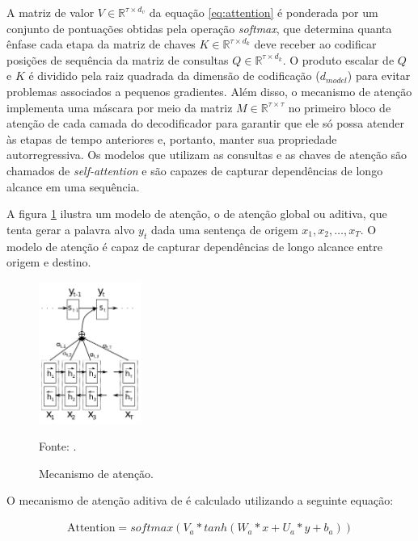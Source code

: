             \ipar A matriz de valor $V \in \mathbb{R}^{\tau \times d_v}$ da equação \ref{eq:attention} é ponderada por um conjunto de pontuações obtidas pela operação \textit{softmax}, que determina quanta ênfase cada etapa da matriz de chaves $K \in \mathbb{R}^{\tau \times d_k}$ deve receber ao codificar posições de sequência da matriz de consultas $Q \in \mathbb{R}^{\tau \times d_k}$. O produto escalar de $Q$ e $K$ é dividido pela raiz quadrada da dimensão de codificação ($d_{model}$) para evitar problemas associados a pequenos gradientes. Além disso, o mecanismo de atenção implementa uma máscara por meio da matriz $M \in \mathbb{R}^{\tau \times \tau}$ no primeiro bloco de atenção de cada camada do decodificador para garantir que ele só possa atender às etapas de tempo anteriores e, portanto, manter sua propriedade autorregressiva. Os modelos que utilizam as consultas e as chaves de atenção são chamados de \textit{self-attention} e são capazes de capturar dependências de longo alcance em uma sequência. 

            \ipar A figura \ref{fig:attention} ilustra um modelo de atenção, o de atenção global ou aditiva, que tenta gerar a palavra alvo $y_t$ dada uma sentença de origem $x_1, x_2, \dots, x_T$. O modelo de atenção é capaz de capturar dependências de longo alcance entre origem e destino.

            \begin{figure}[H]
                \centering
                \caption{Mecanismo de atenção.}
                \label{fig:attention}
                \includegraphics[width=0.3\textwidth]{imagens/attention.png}
                \par \footnotesize Fonte: .
            \end{figure}

            \ipar O mecanismo de atenção aditiva de  é calculado utilizando a seguinte equação:

            \begin{equation} 
                \begin{aligned} 
                    \text{Attention} = softmax(V_a * tanh(W_a * x + U_a * y + b_a)) 
                \end{aligned} 
            \end{equation}
            
